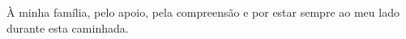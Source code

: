 \begin{dedicatoria}
\vspace*{\fill}
\begin{flushright}
\begin{minipage}{0.5\textwidth}
        
    À minha família, pelo apoio, pela compreensão e por estar sempre ao meu lado durante esta caminhada.

\end{minipage}
\end{flushright}
\vspace*{3cm}
\end{dedicatoria}